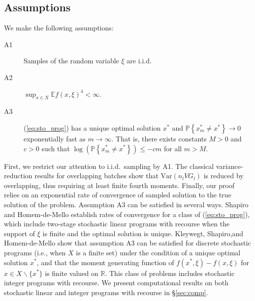 \documentclass[12pt]{article}
\newcommand{\R}{{\mathbb{R}}}
\newcommand{\p}[1]{\mathbb{P} \left\{ #1 \right\}}
\newcommand{\e}[1]{\mathbb{E} %
#1 %
}
\newcommand{\var}[1]{\mathrm{Var} \left( #1 \right)}
\newcommand{\x}{x}
\newcommand{\xs}{\x^*}
\newcommand{\xit}{\xi}
\begin{document}
\subsection{Assumptions}
\label{subsec:assumptions}

We make the following assumptions:

\begin{description}
	\item[A1] Samples of the random variable $\xit$ are i.i.d.
	\item[A2] $\sup_{\x \in X} \e{f(\x,\xi)^{4}} < \infty$.
	\item[A3] (\ref{eq:sto_prog}) has a unique optimal solution $\xs$ and $\p{\xs_m \neq \xs} \rightarrow 0$ exponentially fast as $m \rightarrow \infty$.  
           That is, there exists constants $M > 0$ and $c > 0$ such that $\log(\p{\xs_m \neq \xs}) \leq -cm$ for all $m > M$.
\end{description}

First, we restrict our attention to i.i.d.\ sampling by A1.
The classical variance-reduction results for overlapping batches show that $\var{n_l VG_l}$ is reduced by overlapping, thus requiring at least finite fourth moments. 
Finally, our proof relies on an exponential rate of convergence of sampled solution to the true solution of the problem.  
Assumption A3 can be satisfied in several ways.  
Shapiro and Homem-de-Mello \citep{shapiro2000rate} establish rates of convergence for a class of (\ref{eq:sto_prog}), which include two-stage stochastic linear programs with recourse when the support of $\xit$ is finite and the optimal solution is unique.   
Kleywegt, Shapiro,and Homem-de-Mello \citep{kleywegt2002sample} show that assumption A3 can be satisfied for discrete stochastic programs (i.e., when $X$ is a finite set) under the condition of a unique optimal solution $\xs$, and that the moment generating function of $f(\xs,\xit) - f(\x,\xit)$ for $x \in X \backslash \{\xs\}$ is finite valued on $\R$.  
This class of problems includes stochastic integer programs with recourse.
  We present computational results on both stochastic linear and integer programs with recourse in \S \ref{sec:comp}.

\end{document}
